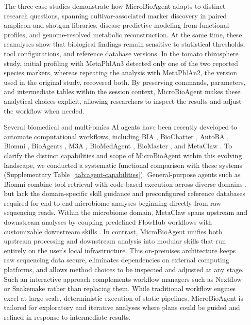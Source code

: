 \documentclass[10pt,letterpaper]{article}
\begin{document}
The three case studies demonstrate how MicroBioAgent adapts to distinct
research questions, spanning cultivar-associated marker discovery in paired
amplicon and shotgun libraries, disease-predictive modeling from functional
profiles, and genome-resolved metabolic reconstruction.  At the same time,
these reanalyses show that biological findings remain sensitive to statistical
thresholds, tool configurations, and reference database versions.  In the
tomato rhizosphere study, initial profiling with MetaPhlAn3 detected only one
of the two reported species markers, whereas repeating the analysis with
MetaPhlAn2, the version used in the original study, recovered both.  By
preserving commands, parameters, and intermediate tables within the session
context, MicroBioAgent makes these analytical choices explicit, allowing
researchers to inspect the results and adjust the workflow when needed.

Several biomedical and multi-omics AI agents have been recently developed to
automate computational workflows, including BIA \parencite{xin2024bia},
BioChatter \parencite{lobentanzer2025biochatter}, AutoBA \parencite{zhou2024autoba},
Biomni \parencite{huang2026biomni}, BioAgents \parencite{mehandru2025bioagents},
M3A \parencite{johri2026m3a}, BioMedAgent \parencite{bu2026biomedagent},
BioMaster \parencite{su2026biomaster}, and MetaClaw \parencite{zhang2026metaclaw}.
To clarify the distinct capabilities and scope of MicroBioAgent within this
evolving landscape, we conducted a systematic functional comparison with these
systems (Supplementary Table~\ref{tab:agent-capabilities}).
General-purpose agents such as Biomni combine tool retrieval with code-based
execution across diverse domains \parencite{huang2026biomni}, but lack the
domain-specific skill guidance and preconfigured reference databases required
for end-to-end microbiome analyses beginning directly from raw sequencing reads.
Within the microbiome domain, MetaClaw spans upstream and downstream analyses
by coupling predefined FlowHub workflows with customizable downstream skills
\parencite{zhang2026metaclaw}.
In contrast, MicroBioAgent unifies both upstream processing and downstream
analysis into modular skills that run entirely on the user's local
infrastructure.  This on-premises architecture keeps raw sequencing data secure,
eliminates dependencies on external computing platforms, and allows method
choices to be inspected and adjusted at any stage.  Such an interactive approach
complements workflow managers such as Nextflow or Snakemake rather than
replacing them.  While traditional workflow engines excel at large-scale,
deterministic execution of static pipelines, MicroBioAgent is tailored for
exploratory and iterative analyses where plans could be guided and refined in
response to intermediate results.
\end{document}
